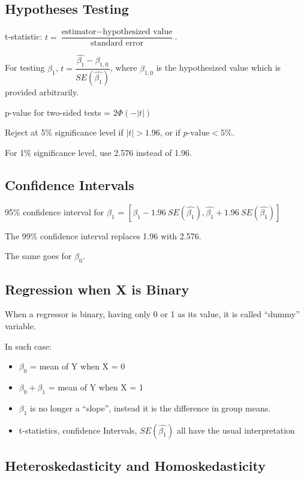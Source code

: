 \documentclass{article}
\begin{document}
\subsection{Hypotheses Testing}

t-statistic: $t = \dfrac{\text{estimator} - \text{hypothesized value}}{\text{standard error}}$.

For testing $\beta_1$, $t = \dfrac{\hat{\beta_1} - \beta_{1,0}}{SE(\hat{\beta_1})}$,
where $\beta_{1,0}$ is the hypothesized value which is provided arbitrarily.

p-value for two-sided tests = $2 \Phi(-|t|)$

Reject at 5\% significance level if $|t| > 1.96$, or if $p\text{-value} < 5\%$.

For 1\% significance level, use 2.576 instead of 1.96.

\subsection{Confidence Intervals}

95\% confidence interval for $\beta_1$ = $\left[ \hat{\beta_1} - 1.96\ SE(\hat{\beta_1}), \hat{\beta_1} + 1.96\ SE(\hat{\beta_1}) \right]$

The 99\% confidence interval replaces 1.96 with 2.576.

The same goes for $\beta_0$.

\subsection{Regression when X is Binary}

When a regressor is binary, having only 0 or 1 as its value,
it is called ``dummy'' variable.

In such case:
\begin{itemize}
	\item $\beta_0$ = mean of Y when X = 0
	\item $\beta_0 + \beta_1$ = mean of Y when X = 1
	\item $\beta_1$ is no longer a ``slope'', instead it is the difference in group means.
	\item t-statistics, confidence Intervals,
	      $SE(\hat{\beta_1})$ all have the usual interpretation
\end{itemize}

\subsection{Heteroskedasticity and Homoskedasticity}
\end{document}
